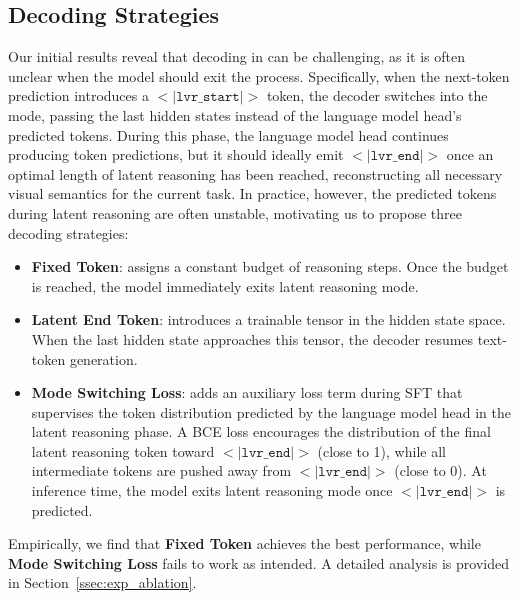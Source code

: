 

\subsection{Decoding Strategies}\label{ssec:lvr_decoding}
Our initial results reveal that decoding in \modelname can be challenging, as it is often unclear when the model should exit the \modelname process. Specifically, when the next-token prediction introduces a $<\vert\texttt{lvr\_start}\vert>$ token, the decoder switches into the \modelname mode, passing the last hidden states instead of the language model head’s predicted tokens. During this phase, the language model head continues producing token predictions, but it should ideally emit $<\vert\texttt{lvr\_end}\vert>$ once an optimal length of latent reasoning has been reached, reconstructing all necessary visual semantics for the current task. In practice, however, the predicted tokens during latent reasoning are often unstable, motivating us to propose three decoding strategies:
\begin{itemize}[left=0pt]
    \item \textbf{Fixed Token}: assigns a constant budget of reasoning steps. Once the budget is reached, the model immediately exits latent reasoning mode.
    \item \textbf{Latent End Token}: introduces a trainable tensor in the hidden state space. When the last hidden state approaches this tensor, the decoder resumes text-token generation.
    \item \textbf{Mode Switching Loss}: adds an auxiliary loss term during SFT that supervises the token distribution predicted by the language model head in the latent reasoning phase. A BCE loss encourages the distribution of the final latent reasoning token toward $<\vert\texttt{lvr\_end}\vert>$ (close to 1), while all intermediate tokens are pushed away from $<\vert\texttt{lvr\_end}\vert>$ (close to 0). At inference time, the model exits latent reasoning mode once $<\vert\texttt{lvr\_end}\vert>$ is predicted.
\end{itemize}

Empirically, we find that \textbf{Fixed Token} achieves the best performance, while \textbf{Mode Switching Loss} fails to work as intended. A detailed analysis is provided in Section~\ref{ssec:exp_ablation}.

